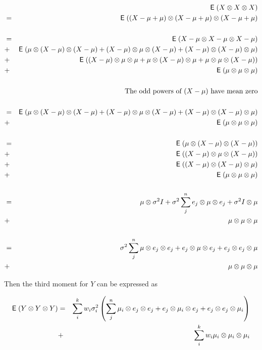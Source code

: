 \documentclass{book}
\numberwithin{exercise}{chapter}
\begin{document}
\newcommand{\tensor}[3]{
  \ensuremath{#1 \otimes #2 \otimes #3}
}

\newcommand{\tensorsame}[1]{
  \tensor{#1}{#1}{#1}
}

\newcommand{\perms}[2]{
  \tensor{#1}{#2}{#2} +
  \tensor{#2}{#1}{#2} +
  \tensor{#2}{#2}{#1}
}

\begin{eqnarray*}
&&\E(X \otimes X \otimes X) \\
  &=& \E((X - \mu + \mu) \otimes (X - \mu + \mu) \otimes (X - \mu + \mu)
  \\ \\
  &=& \E(\tensorsame{X - \mu}) \\
  &+& \E(\perms{\mu}{(X - \mu)}) \\
  &+& \E(\perms{(X - \mu)}{\mu}) \\
  &+& \E(\tensorsame{\mu}) \\
&&\\
&&\text{ The odd powers of $(X-\mu)$ have mean zero} \\
&&\\
  &=& \E(\perms{\mu}{(X - \mu)}) \\
  &+& \E(\tensorsame{\mu}) \\ \\
  &=& \E(\tensor{\mu}{(X - \mu)}{(X - \mu)}) \\
  &+& \E(\tensor{(X - \mu)}{\mu}{(X - \mu)}) \\
  &+& \E(\tensor{(X - \mu)}{(X - \mu)}{\mu}) \\
  &+& \E(\tensorsame{\mu}) \\ \\
  &=& \mu \otimes \sigma^2 I
   +  \sigma^2 \sum_j^n \tensor{e_j}{\mu}{e_j}
   +  \sigma^2 I \otimes \mu \\
  &+& \tensorsame{\mu} \\ \\
  &=& \sigma^2 \sum_j^n \perms{\mu}{e_j} \\
  &+& \tensorsame{\mu} \\
\end{eqnarray*}

Then the third moment for $Y$ can be expressed as

\begin{eqnarray*}
  \E(\tensorsame{Y})
  &=& \sum_i^k w_i \sigma^2_i \left( \sum_j^n \perms{\mu_i}{e_j} \right) \\
  &+& \sum_i^k w_i \tensorsame{\mu_i}
\end{eqnarray*}
\end{document}
